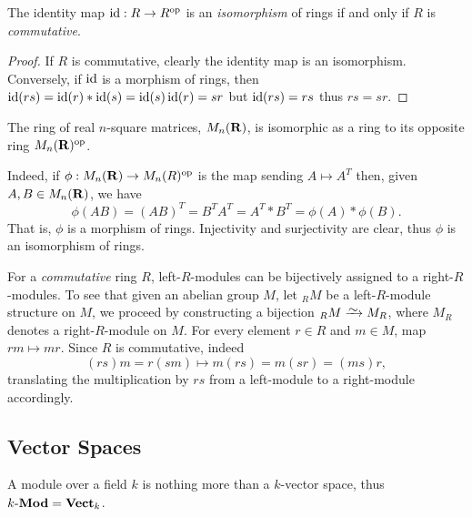 \begin{corollary}
\label{cor:id-ring-and-opposite}
The identity map \(\operatorname{id}: R \to R^{\mathrm{op}}\) is an \emph{isomorphism} of rings if and
only if \(R\) is \emph{commutative}.
\end{corollary}

\begin{proof}
If \(R\) is commutative, clearly the identity map is an isomorphism. Conversely,
if \(\operatorname{id}\) is a morphism of rings, then
\(\operatorname{id}(r s) = \operatorname{id}(r) * \operatorname{id}(s) = \operatorname{id}(s) \operatorname{id}(r) = s r\) but
\(\operatorname{id}(r s) = r s\) thus \(r s = s r\).
\end{proof}

\begin{example}
\label{exp:ring-of-square-matrices}
The ring of real \(n\)-square matrices, \(M_n(\mathbf{R})\), is isomorphic as a ring to
its opposite ring \(M_n(\mathbf{R})^{\mathrm{op}}\).

Indeed, if \(\phi: M_n(\mathbf{R}) \to M_n(R)^{\mathrm{op}}\) is the map sending \(A \mapsto
A^T\) then, given \(A, B \in M_n(\mathbf{R})\), we have
\[
\phi(A B) = (A B)^T = B^T A^T = A^T * B^T = \phi(A) * \phi(B).
\]
That is, \(\phi\) is a morphism of rings. Injectivity and surjectivity are
clear, thus \(\phi\) is an isomorphism of rings.
\end{example}

\begin{example}
\label{exp:right-module-to-left-module}
For a \emph{commutative} ring \(R\), left-\(R\)-modules can be bijectively
assigned to a right-\(R\)-modules. To see that given an abelian group \(M\), let
\({}_RM\) be a left-\(R\)-module structure on \(M\), we proceed by constructing
a bijection \({}_RM \isoto M_R\), where \(M_R\) denotes a right-\(R\)-module on
\(M\). For every element \(r \in R\) and \(m \in M\), map \(r m \mapsto m
r\). Since \(R\) is commutative, indeed
\[
(r s) m = r (s m) \longmapsto m (r s) = m (s r) = (m s) r,
\]
translating the multiplication by \(r s\) from a left-module to a right-module
accordingly.
\end{example}

\subsection{Vector Spaces}

\begin{example}
\label{exp:vector-space-is-k-module}
A module over a field \(k\) is nothing more than a \(k\)-vector space, thus
\({k\text{-}\textbf{Mod}} = {\textbf{Vect}}_k\).
\end{example}

